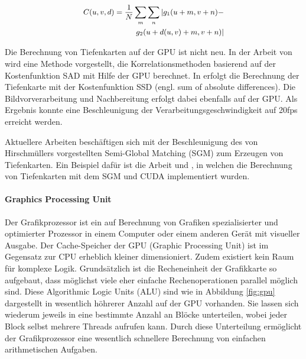 \documentclass[times, 10pt,twocolumn]{article}
\begin{document}
\begin{align}
\small 
\begin{split}
C(u,v,d) = \frac{1}{N}\sum\limits_{m} \sum\limits_{n} | g_1(u+m,v+n) - \\ g_2(u+d(u,v)+m,v+n)|
\label{eq:sad}
\end{split}
\end{align}


Die Berechnung von Tiefenkarten auf der GPU ist nicht neu. In der Arbeit von \cite{Yang.2002} wird eine Methode vorgestellt, die Korrelationsmethoden basierend auf der Kostenfunktion SAD mit Hilfe der GPU berechnet. In \cite{Woetzel.2004} erfolgt die Berechnung der Tiefenkarte mit der Kostenfunktion SSD (engl. sum of absolute differences). Die Bildvorverarbeitung und Nachbereitung erfolgt dabei ebenfalls auf der GPU. Als Ergebnis konnte eine Beschleunigung der Verarbeitungsgeschwindigkeit auf 20fps erreicht werden.

Aktuellere Arbeiten beschäftigen sich mit der Beschleunigung des von Hirschmüllers vorgestellten Semi-Global Matching (SGM) \cite{Hirschmuller.2005} zum Erzeugen von Tiefenkarten. Ein Beispiel dafür ist die Arbeit \cite{Hirschmueller.2008} und \cite{Rosenberg.2006}, in welchen die Berechnung von Tiefenkarten mit dem SGM und CUDA implementiert wurden.

\paragraph{Graphics Processing Unit}
Der Grafikprozessor ist ein auf Berechnung von Grafiken spezialisierter und optimierter Prozessor in einem Computer oder einem anderen Gerät mit visueller Ausgabe.
Der Cache-Speicher der GPU (Graphic Processing Unit) ist im Gegensatz zur CPU erheblich kleiner dimensioniert. Zudem existiert kein Raum für komplexe Logik. Grundsätzlich ist die Recheneinheit der Grafikkarte so aufgebaut, dass möglichst viele eher einfache Rechenoperationen parallel möglich sind.
Diese Algorithmic Logic Units (ALU) sind wie in Abbildung \ref{fig:gpu} dargestellt in wesentlich höhrerer Anzahl auf der GPU vorhanden. Sie lassen sich wiederum jeweils in eine bestimmte Anzahl an Blöcke unterteilen, wobei jeder Block selbst mehrere Threads aufrufen kann. Durch diese Unterteilung ermöglicht der Grafikprozessor eine wesentlich schnellere Berechnung von einfachen arithmetischen Aufgaben.
\end{document}
